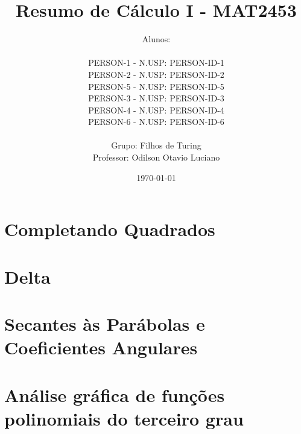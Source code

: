 \documentclass[12pt, a4paper]{article}
\title{
	Resumo de Cálculo I - MAT2453
}
\author{
	Alunos:
	\\  
	\\ {{PERSON-1}} - N.USP: {{PERSON-ID-1}}
	\\ {{PERSON-2}} - N.USP: {{PERSON-ID-2}}
	\\ {{PERSON-5}} - N.USP: {{PERSON-ID-5}}
	\\ {{PERSON-3}} - N.USP: {{PERSON-ID-3}}
	\\ {{PERSON-4}} - N.USP: {{PERSON-ID-4}}
	\\ {{PERSON-6}} - N.USP: {{PERSON-ID-6}}
	\\ \\
	Grupo: Filhos de Turing
	\\ Professor: Odilson Otavio Luciano
}
\date{\today}
\begin{document}
	\maketitle
	\thispagestyle{empty}
	\newpage

	\tableofcontents
	
	\newpage

	\section{Completando Quadrados}

	

	\section{Delta}

	

	\section{Secantes às Parábolas e Coeficientes Angulares}

	

	\section{Análise gráfica de funções polinomiais do terceiro grau}

	
\end{document}
